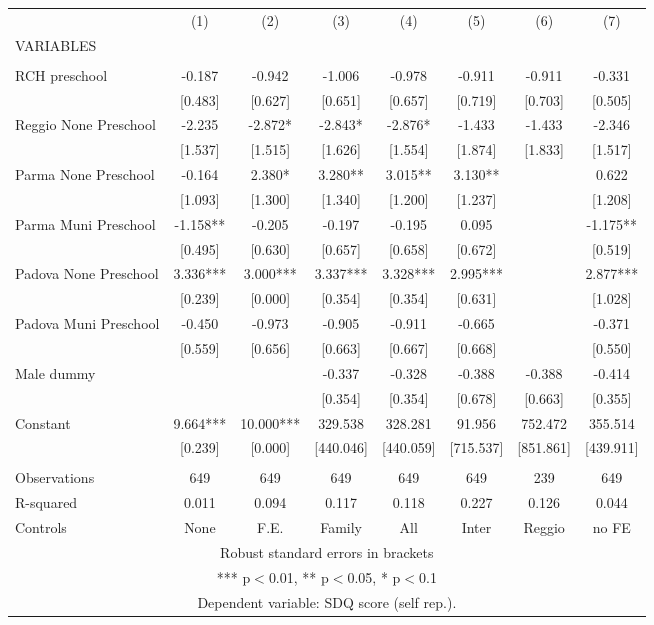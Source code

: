\begin{tabular}{lccccccc} \hline
 & (1) & (2) & (3) & (4) & (5) & (6) & (7) \\
VARIABLES &  &  &  &  &  &  &  \\ \hline
 &  &  &  &  &  &  &  \\
RCH preschool & -0.187 & -0.942 & -1.006 & -0.978 & -0.911 & -0.911 & -0.331 \\
 & [0.483] & [0.627] & [0.651] & [0.657] & [0.719] & [0.703] & [0.505] \\
Reggio None Preschool & -2.235 & -2.872* & -2.843* & -2.876* & -1.433 & -1.433 & -2.346 \\
 & [1.537] & [1.515] & [1.626] & [1.554] & [1.874] & [1.833] & [1.517] \\
Parma None Preschool & -0.164 & 2.380* & 3.280** & 3.015** & 3.130** &  & 0.622 \\
 & [1.093] & [1.300] & [1.340] & [1.200] & [1.237] &  & [1.208] \\
Parma Muni Preschool & -1.158** & -0.205 & -0.197 & -0.195 & 0.095 &  & -1.175** \\
 & [0.495] & [0.630] & [0.657] & [0.658] & [0.672] &  & [0.519] \\
Padova None Preschool & 3.336*** & 3.000*** & 3.337*** & 3.328*** & 2.995*** &  & 2.877*** \\
 & [0.239] & [0.000] & [0.354] & [0.354] & [0.631] &  & [1.028] \\
Padova Muni Preschool & -0.450 & -0.973 & -0.905 & -0.911 & -0.665 &  & -0.371 \\
 & [0.559] & [0.656] & [0.663] & [0.667] & [0.668] &  & [0.550] \\
Male dummy &  &  & -0.337 & -0.328 & -0.388 & -0.388 & -0.414 \\
 &  &  & [0.354] & [0.354] & [0.678] & [0.663] & [0.355] \\
Constant & 9.664*** & 10.000*** & 329.538 & 328.281 & 91.956 & 752.472 & 355.514 \\
 & [0.239] & [0.000] & [440.046] & [440.059] & [715.537] & [851.861] & [439.911] \\
 &  &  &  &  &  &  &  \\
Observations & 649 & 649 & 649 & 649 & 649 & 239 & 649 \\
R-squared & 0.011 & 0.094 & 0.117 & 0.118 & 0.227 & 0.126 & 0.044 \\
 Controls & None & F.E. & Family & All & Inter & Reggio & no FE \\ \hline
\multicolumn{8}{c}{ Robust standard errors in brackets} \\
\multicolumn{8}{c}{ *** p$<$0.01, ** p$<$0.05, * p$<$0.1} \\
\multicolumn{8}{c}{ Dependent variable: SDQ score (self rep.).} \\
\end{tabular}
